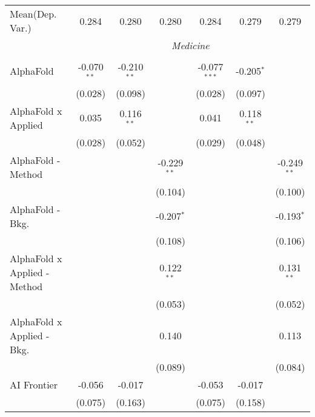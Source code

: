 \begin{tabular}{lcccccc}
Mean(Dep. Var.) & 0.284 & 0.280 & 0.280 & 0.284 & 0.279 & 0.279 \\
 & \multicolumn{6}{c}{\textit{Medicine}} \\ \\
   AlphaFold                      & -0.070$^{**}$ & -0.210$^{**}$ &                & -0.077$^{***}$ & -0.205$^{*}$   &   \\   
                                  & (0.028)       & (0.098)       &                & (0.028)        & (0.097)        &   \\   
   AlphaFold x Applied            & 0.035         & 0.116$^{**}$  &                & 0.041          & 0.118$^{**}$   &   \\   
                                  & (0.028)       & (0.052)       &                & (0.029)        & (0.048)        &   \\   
   AlphaFold - Method             &               &               & -0.229$^{**}$  &                &                & -0.249$^{**}$\\   
                                  &               &               & (0.104)        &                &                & (0.100)\\   
   AlphaFold - Bkg.               &               &               & -0.207$^{*}$   &                &                & -0.193$^{*}$\\   
                                  &               &               & (0.108)        &                &                & (0.106)\\   
   AlphaFold x Applied - Method   &               &               & 0.122$^{**}$   &                &                & 0.131$^{**}$\\   
                                  &               &               & (0.053)        &                &                & (0.052)\\   
   AlphaFold x Applied - Bkg.     &               &               & 0.140          &                &                & 0.113\\   
                                  &               &               & (0.089)        &                &                & (0.084)\\   
   AI Frontier                    & -0.056        & -0.017        &                & -0.053         & -0.017         &   \\   
                                  & (0.075)       & (0.163)       &                & (0.075)        & (0.158)        &   \\   

\end{tabular}
